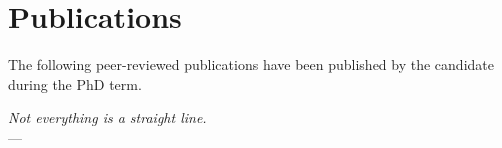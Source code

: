 
{}
\chapter*{Publications}

\manualmark
{}

\noindent The following peer-reviewed publications have been published by the candidate during the PhD term.
%
\begin{refsection}
    \nocite{*} %
    \printbibliography[heading=none,keyword=own]
\end{refsection}

\begin{flushright}{\slshape
    Not everything is a straight line.} \\ \medskip
    --- \textcite{tukey_exploratory_1977}
\end{flushright}

\vfill
